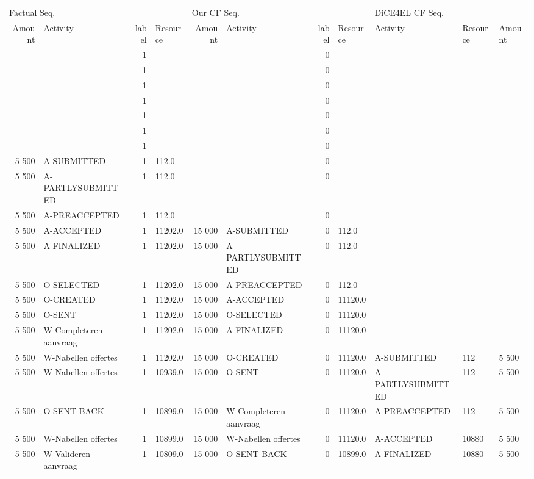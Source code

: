 \begin{tabular}{rlrlrlrllll}
\toprule
\multicolumn{4}{l}{Factual Seq.} & \multicolumn{4}{l}{Our CF Seq.} & \multicolumn{3}{l}{DiCE4EL CF Seq.} \\
Amount & Activity & label & Resource & Amount & Activity & label & Resource & Activity & Resource & Amount \\
\midrule
 &  & 1 &  &  &  & 0 &  &  &  &  \\
 &  & 1 &  &  &  & 0 &  &  &  &  \\
 &  & 1 &  &  &  & 0 &  &  &  &  \\
 &  & 1 &  &  &  & 0 &  &  &  &  \\
 &  & 1 &  &  &  & 0 &  &  &  &  \\
 &  & 1 &  &  &  & 0 &  &  &  &  \\
 &  & 1 &  &  &  & 0 &  &  &  &  \\
5 500 & A-SUBMITTED & 1 & 112.0 &  &  & 0 &  &  &  &  \\
5 500 & A-PARTLYSUBMITTED & 1 & 112.0 &  &  & 0 &  &  &  &  \\
5 500 & A-PREACCEPTED & 1 & 112.0 &  &  & 0 &  &  &  &  \\
5 500 & A-ACCEPTED & 1 & 11202.0 & 15 000 & A-SUBMITTED & 0 & 112.0 &  &  &  \\
5 500 & A-FINALIZED & 1 & 11202.0 & 15 000 & A-PARTLYSUBMITTED & 0 & 112.0 &  &  &  \\
5 500 & O-SELECTED & 1 & 11202.0 & 15 000 & A-PREACCEPTED & 0 & 112.0 &  &  &  \\
5 500 & O-CREATED & 1 & 11202.0 & 15 000 & A-ACCEPTED & 0 & 11120.0 &  &  &  \\
5 500 & O-SENT & 1 & 11202.0 & 15 000 & O-SELECTED & 0 & 11120.0 &  &  &  \\
5 500 & W-Completeren aanvraag & 1 & 11202.0 & 15 000 & A-FINALIZED & 0 & 11120.0 &  &  &  \\
5 500 & W-Nabellen offertes & 1 & 11202.0 & 15 000 & O-CREATED & 0 & 11120.0 & A-SUBMITTED & 112 & 5 500 \\
5 500 & W-Nabellen offertes & 1 & 10939.0 & 15 000 & O-SENT & 0 & 11120.0 & A-PARTLYSUBMITTED & 112 & 5 500 \\
5 500 & O-SENT-BACK & 1 & 10899.0 & 15 000 & W-Completeren aanvraag & 0 & 11120.0 & A-PREACCEPTED & 112 & 5 500 \\
5 500 & W-Nabellen offertes & 1 & 10899.0 & 15 000 & W-Nabellen offertes & 0 & 11120.0 & A-ACCEPTED & 10880 & 5 500 \\
5 500 & W-Valideren aanvraag & 1 & 10809.0 & 15 000 & O-SENT-BACK & 0 & 10899.0 & A-FINALIZED & 10880 & 5 500 \\

\end{tabular}
